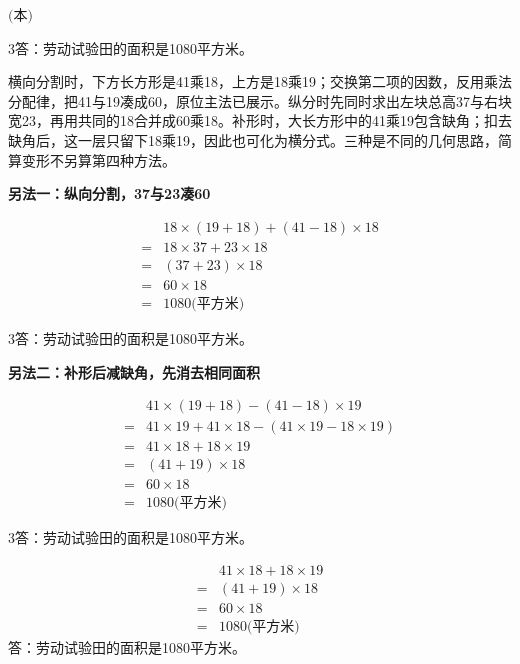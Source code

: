 \documentclass[multi=snippet,border={5bp 20bp 5bp 5bp}]{standalone}
\newenvironment{snippet}[3]{\begin{minipage}{#1bp}\color{answerred}\fontsize{#2}{#3}\selectfont\raggedright}{\end{minipage}}
\begin{document}
\begin{snippet}{80}{10.0}{14}\SourceSans\setlength{\mathindent}{2bp}\(\text{(本)}\)\end{snippet}
\begin{snippet}{505}{11.5}{14}\begin{multicols}{3}\raggedcolumns 答：劳动试验田的面积是1080平方米。\par 横向分割时，下方长方形是41乘18，上方是18乘19；交换第二项的因数，反用乘法分配律，把41与19凑成60，原位主法已展示。纵分时先同时求出左块总高37与右块宽23，再用共同的18合并成60乘18。补形时，大长方形中的41乘19包含缺角；扣去缺角后，这一层只留下18乘19，因此也可化为横分式。三种是不同的几何思路，简算变形不另算第四种方法。\par \textbf{另法一：纵向分割，37与23凑60}\par \end{multicols}\[\begin{aligned}&18\times(19+18)+(41-18)\times18\\={}&18\times37+23\times18\\={}&(37+23)\times18\\={}&60\times18\\={}&1080\text{(平方米)}\end{aligned}\]\begin{multicols}{3}\raggedcolumns 答：劳动试验田的面积是1080平方米。\par \textbf{另法二：补形后减缺角，先消去相同面积}\par \end{multicols}\[\begin{aligned}&41\times(19+18)-(41-18)\times19\\={}&41\times19+41\times18-(41\times19-18\times19)\\={}&41\times18+18\times19\\={}&(41+19)\times18\\={}&60\times18\\={}&1080\text{(平方米)}\end{aligned}\]\begin{multicols}{3}\raggedcolumns 答：劳动试验田的面积是1080平方米。\end{multicols}\end{snippet}
\begin{snippet}{289}{10.5}{12.8}\SourceSans\setlength{\mathindent}{2bp}\[\begin{aligned}&41\times18+18\times19\\={}&(41+19)\times18\\={}&60\times18\\={}&1080\text{(平方米)}\end{aligned}\]答：劳动试验田的面积是1080平方米。\end{snippet}
\end{document}
